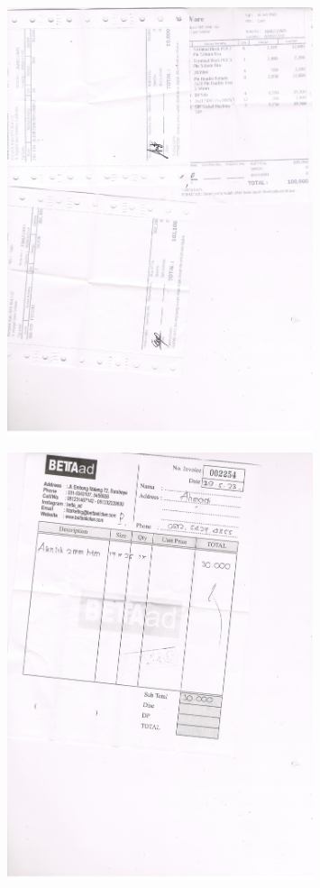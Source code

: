 \documentclass{article} %
\begin{document}
	\begin{figure}[H]
		\centering
		\includegraphics[width=0.8\textwidth]{images/komponen3}
	\end{figure}

	\begin{figure}[H]
		\centering
		\includegraphics[width=0.8\textwidth]{images/akrilik}
	\end{figure}
\end{document}
